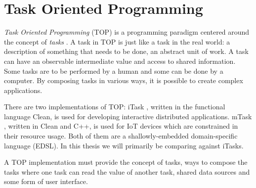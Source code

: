 \section{Task Oriented Programming}\label{section-top}

\textit{Task Oriented Programming} (TOP) is a programming paradigm centered around the concept of \textit{tasks} \cite{plasmeijer2012task}.
A task in TOP is just like a task in the real world: a description of something that needs to be done, an abstract unit of work. A task can have an observable intermediate value and access to shared information. Some tasks are to be performed by a human and some can be done by a computer. By composing tasks in various ways, it is possible to create complex applications.

There are two implementations of TOP: iTask \cite{plasmeijer2007itasks}, written in the functional language Clean, is used for developing interactive distributed applications. mTask \cite{koopman2018task, lubbers2019multitasking}, written in Clean and C++, is used for IoT devices which are constrained in their resource usage. Both of them are a shallowly-embedded domain-specific language (EDSL). In this thesis we will primarily be comparing against iTasks.

A TOP implementation must provide the concept of tasks, ways to compose the tasks where one task can read the value of another task, shared data sources and some form of user interface.



